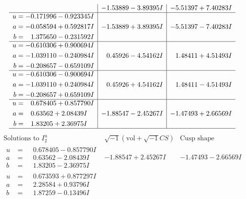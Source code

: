 \documentclass[1p]{elsarticle_modified}
\theoremstyle{definition}
\newcommand{\I}{\sqrt{-1}}
\begin{document}
$$\begin{array}{c|c|c}
 & -1.53889 - 3.89395 I & -5.51397 + 7.40283 I \\ \hline\begin{aligned}
u &= -0.171996 - 0.923345 I \\
a &= -0.058594 + 0.592817 I \\
b &= \phantom{-}1.375650 - 0.231592 I\end{aligned}
 & -1.53889 + 3.89395 I & -5.51397 - 7.40283 I \\ \hline\begin{aligned}
u &= -0.610306 + 0.900694 I \\
a &= -1.039110 - 0.240984 I \\
b &= -0.208657 - 0.659109 I\end{aligned}
 & \phantom{-}0.45926 - 4.54162 I & \phantom{-}1.48411 + 4.51493 I \\ \hline\begin{aligned}
u &= -0.610306 - 0.900694 I \\
a &= -1.039110 + 0.240984 I \\
b &= -0.208657 + 0.659109 I\end{aligned}
 & \phantom{-}0.45926 + 4.54162 I & \phantom{-}1.48411 - 4.51493 I \\ \hline\begin{aligned}
u &= \phantom{-}0.678405 + 0.857790 I \\
a &= \phantom{-}0.63562 + 2.08439 I \\
b &= \phantom{-}1.83205 + 2.36975 I\end{aligned}
 & -1.88547 - 2.45267 I & -1.47493 + 2.66569 I\\
 \hline 
 \end{array}$$\newpage$$\begin{array}{c|c|c}  
\text{Solutions to }I^u_{2}& \I (\text{vol} + \sqrt{-1}CS) & \text{Cusp shape}\\
 \hline 
\begin{aligned}
u &= \phantom{-}0.678405 - 0.857790 I \\
a &= \phantom{-}0.63562 - 2.08439 I \\
b &= \phantom{-}1.83205 - 2.36975 I\end{aligned}
 & -1.88547 + 2.45267 I & -1.47493 - 2.66569 I \\ \hline\begin{aligned}
u &= \phantom{-}0.673593 + 0.877297 I \\
a &= \phantom{-}2.28584 + 0.93796 I \\
b &= \phantom{-}1.87259 - 0.13496 I\end{aligned}

\end{array}$$
\end{document}
